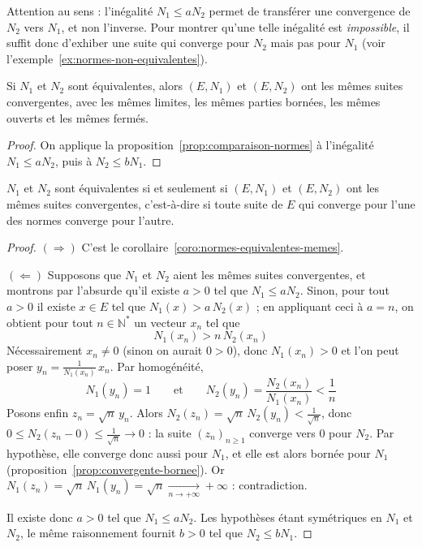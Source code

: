 \begin{remarque}
Attention au sens : l'inégalité $N_1\leq aN_2$ permet de transférer une convergence de $N_2$ vers $N_1$, et non l'inverse. Pour montrer qu'une telle inégalité est \emph{impossible}, il suffit donc d'exhiber une suite qui converge pour $N_2$ mais pas pour $N_1$ (voir l'exemple~\ref{ex:normes-non-equivalentes}).
\end{remarque}

\begin{coro}
\label{coro:normes-equivalentes-memes}
Si $N_1$ et $N_2$ sont équivalentes, alors $(E,N_1)$ et $(E,N_2)$ ont les mêmes suites convergentes, avec les mêmes limites, les mêmes parties bornées, les mêmes ouverts et les mêmes fermés.
\end{coro}

\begin{proof}
On applique la proposition~\ref{prop:comparaison-normes} à l'inégalité $N_1\leq aN_2$, puis à $N_2\leq bN_1$.
\end{proof}

\begin{prop}
\label{prop:normes-equivalentes-suites}
$N_1$ et $N_2$ sont équivalentes si et seulement si $(E,N_1)$ et $(E,N_2)$ ont les mêmes suites convergentes, c'est-à-dire si toute suite de $E$ qui converge pour l'une des normes converge pour l'autre.
\end{prop}

\begin{proof}
$(\Rightarrow)$ C'est le corollaire~\ref{coro:normes-equivalentes-memes}.

$(\Leftarrow)$ Supposons que $N_1$ et $N_2$ aient les mêmes suites convergentes, et montrons par l'absurde qu'il existe $a>0$ tel que $N_1\leq aN_2$. Sinon, pour tout $a>0$ il existe $x\in E$ tel que $N_1(x)>a\,N_2(x)$ ; en appliquant ceci à $a=n$, on obtient pour tout $n\in\mathbb{N}^*$ un vecteur $x_n$ tel que
\[N_1(x_n) > n\,N_2(x_n)\]
Nécessairement $x_n\neq 0$ (sinon on aurait $0>0$), donc $N_1(x_n)>0$ et l'on peut poser $y_n=\frac{1}{N_1(x_n)}\,x_n$. Par homogénéité,
\[N_1(y_n)=1 \qquad\text{et}\qquad N_2(y_n)=\frac{N_2(x_n)}{N_1(x_n)}<\frac1n\]
Posons enfin $z_n=\sqrt{n}\,y_n$. Alors $N_2(z_n)=\sqrt n\,N_2(y_n)<\frac{1}{\sqrt n}$, donc $0\leq N_2(z_n-0)\leq\frac{1}{\sqrt n}\to 0$ : la suite $(z_n)_{n\geq1}$ converge vers $0$ pour $N_2$. Par hypothèse, elle converge donc aussi pour $N_1$, et elle est alors bornée pour $N_1$ (proposition~\ref{prop:convergente-bornee}). Or $N_1(z_n)=\sqrt n\,N_1(y_n)=\sqrt n\xrightarrow[n\to+\infty]{}+\infty$ : contradiction.

Il existe donc $a>0$ tel que $N_1\leq aN_2$. Les hypothèses étant symétriques en $N_1$ et $N_2$, le même raisonnement fournit $b>0$ tel que $N_2\leq bN_1$.
\end{proof}

